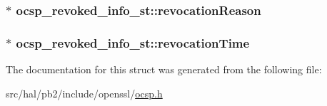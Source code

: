 \subsubsection[{\texorpdfstring{revocation\+Reason}{revocationReason}}]{$\ast$ ocsp\+\_\+revoked\+\_\+info\+\_\+st\+::revocation\+Reason}\hypertarget{structocsp__revoked__info__st_a07edd6ecff783b2ad3e0ecf143fdddc3}{}\label{structocsp__revoked__info__st_a07edd6ecff783b2ad3e0ecf143fdddc3}
\subsubsection[{\texorpdfstring{revocation\+Time}{revocationTime}}]{$\ast$ ocsp\+\_\+revoked\+\_\+info\+\_\+st\+::revocation\+Time}\hypertarget{structocsp__revoked__info__st_af95cc4676f07ed0d45dfbe2c4b851902}{}\label{structocsp__revoked__info__st_af95cc4676f07ed0d45dfbe2c4b851902}


The documentation for this struct was generated from the following file\+:\begin{DoxyCompactItemize}
\item 
src/hal/pb2/include/openssl/\hyperlink{ocsp_8h}{ocsp.\+h}\end{DoxyCompactItemize}
